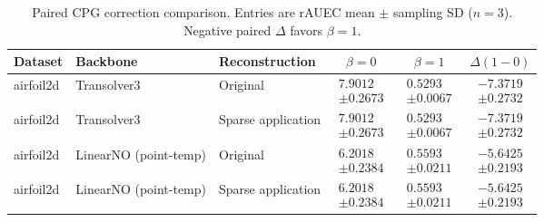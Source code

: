 \begin{table}[t]
\centering\small
\caption{Paired CPG correction comparison. Entries are rAUEC mean $\pm$ sampling SD ($n=3$). Negative paired $\Delta$ favors $\beta=1$.}
\setlength{\tabcolsep}{4pt}
\begin{tabular}{lllccc}
\toprule
Dataset & Backbone & Reconstruction & $\beta=0$ & $\beta=1$ & $\Delta(1-0)$ \\
\midrule
airfoil2d & Transolver3 & Original & $\begin{gathered}7.9012\\[-2pt]\pm 0.2673\end{gathered}$ & $\begin{gathered}0.5293\\[-2pt]\pm 0.0067\end{gathered}$ & $\begin{gathered}-7.3719\\[-2pt]\pm 0.2732\end{gathered}$ \\
airfoil2d & Transolver3 & Sparse application & $\begin{gathered}7.9012\\[-2pt]\pm 0.2673\end{gathered}$ & $\begin{gathered}0.5293\\[-2pt]\pm 0.0067\end{gathered}$ & $\begin{gathered}-7.3719\\[-2pt]\pm 0.2732\end{gathered}$ \\
airfoil2d & LinearNO (point-temp) & Original & $\begin{gathered}6.2018\\[-2pt]\pm 0.2384\end{gathered}$ & $\begin{gathered}0.5593\\[-2pt]\pm 0.0211\end{gathered}$ & $\begin{gathered}-5.6425\\[-2pt]\pm 0.2193\end{gathered}$ \\
airfoil2d & LinearNO (point-temp) & Sparse application & $\begin{gathered}6.2018\\[-2pt]\pm 0.2384\end{gathered}$ & $\begin{gathered}0.5593\\[-2pt]\pm 0.0211\end{gathered}$ & $\begin{gathered}-5.6425\\[-2pt]\pm 0.2193\end{gathered}$ \\
\bottomrule
\end{tabular}
\end{table}
